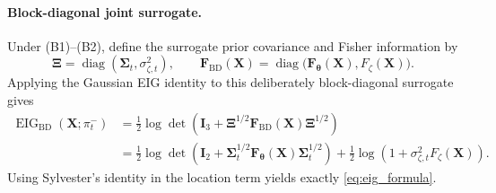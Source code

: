 \documentclass{article}
\DeclareMathOperator{\diag}{diag}
\newcommand{\bs}[1]{\boldsymbol{#1}}
\newcommand{\bX}{\mathbf{X}}
\begin{document}
\paragraph{Block-diagonal joint surrogate.}
Under (B1)--(B2), define the surrogate prior covariance and Fisher information by
\begin{equation}
\bs\Xi=\diag(\bs\Sigma_t,\sigma_{\zeta,t}^2),
\qquad
\bs F_{\mathrm{BD}}(\bX)=\diag\!\bigl(\bs F_{\bs\theta}(\bX),F_\zeta(\bX)\bigr).
\end{equation}
Applying the Gaussian EIG identity to this deliberately block-diagonal surrogate gives
\begin{align}
\operatorname{EIG}_{\mathrm{BD}}(\bX;\pi_t^-)
&=
\tfrac12\log\det\!\left(
\bs I_3+\bs\Xi^{1/2}\bs F_{\mathrm{BD}}(\bX)\bs\Xi^{1/2}
\right)\\
&=
\tfrac12\log\det\!\left(
\bs I_2+\bs\Sigma_t^{1/2}\bs F_{\bs\theta}(\bX)\bs\Sigma_t^{1/2}
\right)
+\tfrac12\log\!\left(1+\sigma_{\zeta,t}^2F_\zeta(\bX)\right).
\end{align}
Using Sylvester's identity in the location term yields exactly \eqref{eq:eig_formula}.



\end{document}
